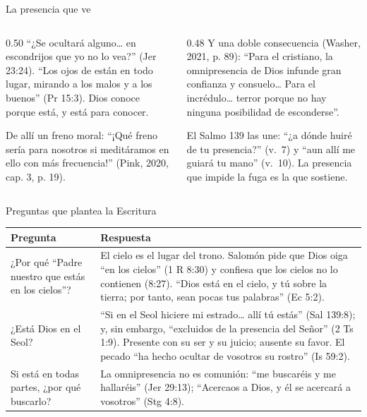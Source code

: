 \begin{frame}{La presencia que ve}
\begin{columns}[t,onlytextwidth]
\begin{column}{0.50\textwidth}\scriptsize
``¿Se ocultará alguno\ldots{} en escondrijos que yo no lo vea?'' (Jer 23:24). ``Los ojos de \SENOR{} están en todo lugar, mirando a los malos y a los buenos'' (Pr 15:3). Dios conoce porque está, y está para conocer.\par\medskip
De allí un freno moral: ``¡Qué freno sería para nosotros si meditáramos en ello con más frecuencia!'' (Pink, 2020, cap. 3, p. 19).
\end{column}
\begin{column}{0.48\textwidth}\scriptsize
Y una doble consecuencia (Washer, 2021, p. 89): ``Para el cristiano, la omnipresencia de Dios infunde gran confianza y consuelo\ldots{} Para el incrédulo\ldots{} terror porque no hay ninguna posibilidad de esconderse''.\par\medskip
El Salmo 139 las une: ``¿a dónde huiré de tu presencia?'' (v.~7) y ``aun allí me guiará tu mano'' (v.~10). La presencia que impide la fuga es la que sostiene.
\end{column}
\end{columns}
\end{frame}

\begin{frame}{Preguntas que plantea la Escritura}
\scriptsize\renewcommand{\arraystretch}{1.2}
\begin{tabular}{@{}>{\RaggedRight\arraybackslash}p{3.4cm}>{\RaggedRight\arraybackslash}p{8.4cm}@{}}
\toprule
\textbf{Pregunta} & \textbf{Respuesta} \\ \midrule
¿Por qué ``Padre nuestro que estás en los cielos''? & El cielo es el lugar del trono. Salomón pide que Dios oiga ``en los cielos'' (1 R 8:30) y confiesa que los cielos no lo contienen (8:27). ``Dios está en el cielo, y tú sobre la tierra; por tanto, sean pocas tus palabras'' (Ec 5:2). \\
¿Está Dios en el Seol? & ``Si en el Seol hiciere mi estrado\ldots{} allí tú estás'' (Sal 139:8); y, sin embargo, ``excluidos de la presencia del Señor'' (2 Ts 1:9). Presente con su ser y su juicio; ausente su favor. El pecado ``ha hecho ocultar de vosotros su rostro'' (Is 59:2). \\
Si está en todas partes, ¿por qué buscarlo? & La omnipresencia no es comunión: ``me buscaréis y me hallaréis'' (Jer 29:13); ``Acercaos a Dios, y él se acercará a vosotros'' (Stg 4:8). \\
\bottomrule
\end{tabular}\par\medskip
{}
\end{frame}

